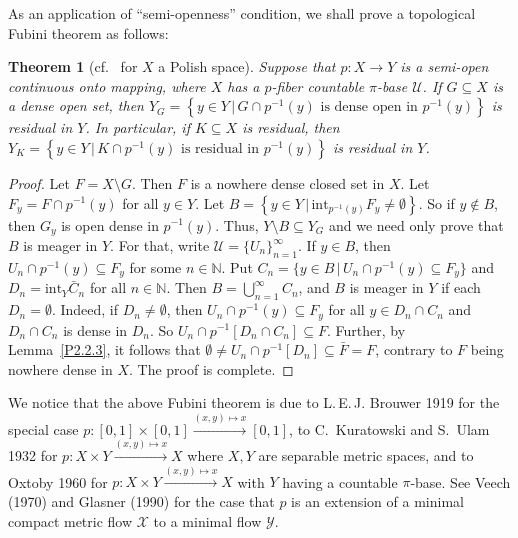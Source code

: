 \documentclass[12pt,final,3p,times]{elsarticle}
\newtheorem{sthm}{Theorem}[subsection]
\theoremstyle{definition}
\numberwithin{equation}{section}
\begin{document}
As an application of ``semi-openness'' condition, we shall prove a topological Fubini theorem as follows:

\begin{sthm}[{cf.~\cite[Lem.~5.3]{D23} for $X$ a Polish space}]\label{P2.2.5}
Suppose that $p\colon X\rightarrow Y$ is a semi-open continuous onto mapping, where
$X$ has a $p$-fiber countable $\pi$-base $\mathscr{U}$. If $G\subseteq X$ is a dense open set, then 
$Y_G=\left\{y\in Y\,|\,G\cap p^{-1}(y)\textrm{ is dense open in }p^{-1}(y)\right\}$
is residual in $Y$. In particular, if $K\subseteq X$ is residual, then
$Y_K=\left\{y\in Y\,|\,K\cap p^{-1}(y)\textrm{ is residual in }p^{-1}(y)\right\}$
is residual in $Y$.
\end{sthm}

\begin{proof}
Let $F=X\setminus G$. Then $F$ is a nowhere dense closed set in $X$. Let $F_y=F\cap p^{-1}(y)$ for all $y\in Y$. Let
$B=\left\{y\in Y\,|\,\mathrm{int}_{p^{-1}(y)}F_y\not=\emptyset\right\}$.
So if $y\notin B$, then $G_y$ is open dense in $p^{-1}(y)$. Thus, $Y\setminus B\subseteq Y_G$ and we need only prove that $B$ is meager in $Y$.
For that, write $\mathscr{U}=\{U_n\}_{n=1}^\infty$. If $y\in B$, then $U_n\cap p^{-1}(y)\subseteq F_y$ for some $n\in\mathbb{N}$.
Put
$C_n=\{y\in B\,|\,U_n\cap p^{-1}(y)\subseteq F_y\}$ and $D_n=\mathrm{int}_Y \bar{C}_n$
for all $n\in\mathbb{N}$. Then $B=\bigcup_{n=1}^\infty C_{n}$, and $B$ is meager in $Y$ if each $D_{n}=\emptyset$. Indeed, if $D_{n}\not=\emptyset$, then $U_n\cap p^{-1}(y)\subseteq F_y$ for all $y\in D_n\cap C_n$ and $D_n\cap C_n$ is dense in $D_n$. So $U_n\cap p^{-1}[D_n\cap C_n]\subseteq F$. Further, by Lemma~\ref{P2.2.3}, it follows that $\emptyset\not=U_n\cap p^{-1}[D_n]\subseteq \bar{F}=F$, contrary to $F$ being nowhere dense in $X$. The proof is complete.
\end{proof}

We notice that the above Fubini theorem is due to L.\,E.\,J. Brouwer 1919 for the special case $p\colon [0,1]\times[0,1]\xrightarrow{(x,y)\mapsto x}[0,1]$, to C.~Kuratowski and S.~Ulam 1932 for $p\colon X\times Y\xrightarrow{(x,y)\mapsto x}X$ where $X,Y$ are separable metric spaces, and to Oxtoby 1960 \cite{O60} for $p\colon X\times Y\xrightarrow{(x,y)\mapsto x}X$ with $Y$ having a countable $\pi$-base. See Veech (1970) \cite[Prop.~3.1]{V70} and Glasner (1990) \cite[Lem.~5.2]{G90} for the case that $p$ is an extension of a minimal compact metric flow $\mathscr{X}$ to a minimal flow $\mathscr{Y}$.
\end{document}
